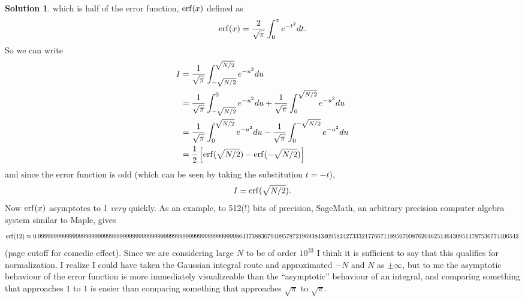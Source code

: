 \documentclass[10pt]{article}
\theoremstyle{definition}
\newtheorem{soln}{Solution}
\begin{document}
\begin{soln}
  which is half of the error function, $\erf(x)$
  defined as
  $$\erf(x)=\frac{2}{\sqrt{\pi}}\int_{0}^{x}e^{-t^2}dt.$$
  So we can write
  \begin{align*}
    I & =\frac{1}{\sqrt{\pi}}\int_{-\sqrt{N/2}}^{\sqrt{N/2}}e^{-u^2}du                                            \\
      & =\frac{1}{\sqrt{\pi}}\int_{-\sqrt{N/2}}^{0}e^{-u^2}du+\frac{1}{\sqrt{\pi}}\int_{0}^{\sqrt{N/2}}e^{-u^2}du \\
      & =\frac{1}{\sqrt{\pi}}\int_{0}^{\sqrt{N/2}}e^{-u^2}du-\frac{1}{\sqrt{\pi}}\int_{0}^{-\sqrt{N/2}}e^{-u^2}du \\
      & =\frac{1}{2}\left[\erf(\sqrt{N/2})-\erf(-\sqrt{N/2})\right]
  \end{align*}
  and since the error function is odd (which can be seen by taking the substitution $t=-t$),
  $$I=\erf(\sqrt{N/2}).$$
  Now $\erf(x)$ asymptotes to 1 \emph{very} quickly. As an example, to 512(!) bits of precision, SageMath, an arbitrary precision computer algebra system similar
  to Maple, gives
  $$\erf(12)\approx0.999999999999999999999999999999999999999999999999999999999999999864373883079409578721969384340958242733321776671189507008762046251464309514787536774406542$$
  (page cutoff for comedic effect). Since we are considering large $N$ to be of order $10^{23}$ I think it is sufficient to say that this qualifies for normalization.
  I realize I could have taken the Gaussian integral route and approximated $-N$ and $N$ as $\pm \infty$, but to me the asymptotic behaviour of the error function 
  is more immediately visualizeable than the ``asymptotic'' behaviour of an integral, and comparing something that approaches $1$ to $1$ is easier 
  than comparing something that approaches $\sqrt{\pi}$ to $\sqrt{\pi}$.
\end{soln}
\end{document}
